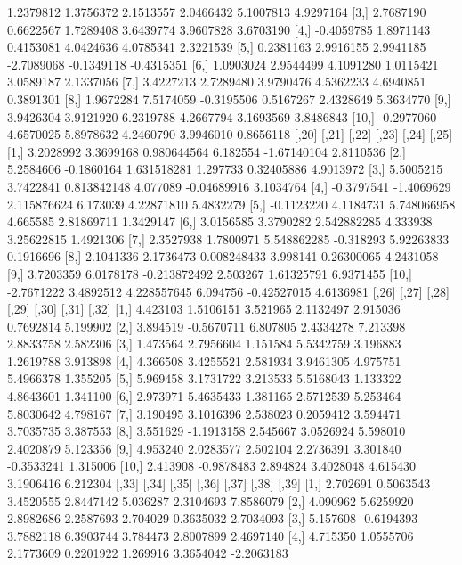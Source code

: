 \documentclass[12pt]{article}
\begin{document}
\begin{Schunk}
\begin{Soutput}
 [2,]  1.2379812 1.3756372  2.1513557  2.0466432  5.1007813  4.9297164
 [3,]  2.7687190 0.6622567  1.7289408  3.6439774  3.9607828  3.6703190
 [4,] -0.4059785 1.8971143  0.4153081  4.0424636  4.0785341  2.3221539
 [5,]  0.2381163 2.9916155  2.9941185 -2.7089068 -0.1349118 -0.4315351
 [6,]  1.0903024 2.9544499  4.1091280  1.0115421  3.0589187  2.1337056
 [7,]  3.4227213 2.7289480  3.9790476  4.5362233  4.6940851  0.3891301
 [8,]  1.9672284 7.5174059 -0.3195506  0.5167267  2.4328649  5.3634770
 [9,]  3.9426304 3.9121920  6.2319788  4.2667794  3.1693569  3.8486843
[10,] -0.2977060 4.6570025  5.8978632  4.2460790  3.9946010  0.8656118
           [,20]      [,21]        [,22]     [,23]       [,24]     [,25]
 [1,]  3.2028992  3.3699168  0.980644564  6.182554 -1.67140104 2.8110536
 [2,]  5.2584606 -0.1860164  1.631518281  1.297733  0.32405886 4.9013972
 [3,]  5.5005215  3.7422841  0.813842148  4.077089 -0.04689916 3.1034764
 [4,] -0.3797541 -1.4069629  2.115876624  6.173039  4.22871810 5.4832279
 [5,] -0.1123220  4.1184731  5.748066958  4.665585  2.81869711 1.3429147
 [6,]  3.0156585  3.3790282  2.542882285  4.333938  3.25622815 1.4921306
 [7,]  2.3527938  1.7800971  5.548862285 -0.318293  5.92263833 0.1916696
 [8,]  2.1041336  2.1736473  0.008248433  3.998141  0.26300065 4.2431058
 [9,]  3.7203359  6.0178178 -0.213872492  2.503267  1.61325791 6.9371455
[10,] -2.7671222  3.4892512  4.228557645  6.094756 -0.42527015 4.6136981
         [,26]      [,27]    [,28]     [,29]    [,30]      [,31]    [,32]
 [1,] 4.423103  1.5106151 3.521965 2.1132497 2.915036  0.7692814 5.199902
 [2,] 3.894519 -0.5670711 6.807805 2.4334278 7.213398  2.8833758 2.582306
 [3,] 1.473564  2.7956604 1.151584 5.5342759 3.196883  1.2619788 3.913898
 [4,] 4.366508  3.4255521 2.581934 3.9461305 4.975751  5.4966378 1.355205
 [5,] 5.969458  3.1731722 3.213533 5.5168043 1.133322  4.8643601 1.341100
 [6,] 2.973971  5.4635433 1.381165 2.5712539 5.253464  5.8030642 4.798167
 [7,] 3.190495  3.1016396 2.538023 0.2059412 3.594471  3.7035735 3.387553
 [8,] 3.551629 -1.1913158 2.545667 3.0526924 5.598010  2.4020879 5.123356
 [9,] 4.953240  2.0283577 2.502104 2.2736391 3.301840 -0.3533241 1.315006
[10,] 2.413908 -0.9878483 2.894824 3.4028048 4.615430  3.1906416 6.212304
         [,33]      [,34]     [,35]     [,36]    [,37]      [,38]      [,39]
 [1,] 2.702691  0.5063543 3.4520555 2.8447142 5.036287  2.3104693  7.8586079
 [2,] 4.090962  5.6259920 2.8982686 2.2587693 2.704029  0.3635032  2.7034093
 [3,] 5.157608 -0.6194393 3.7882118 6.3903744 3.784473  2.8007899  2.4697140
 [4,] 4.715350  1.0555706 2.1773609 0.2201922 1.269916  3.3654042 -2.2063183

\end{Soutput}
\end{Schunk}
\end{document}
